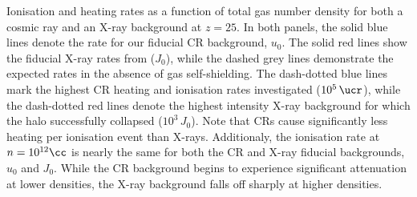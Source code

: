 Ionisation and heating rates as a function of total gas number density for both a cosmic ray and an X-ray background at $z=25$. In both panels, the solid blue lines denote the rate for our fiducial CR background, $u_0$. The solid red lines show the fiducial X-ray rates from \citet{Hummeletal2015} ($J_0$), while the dashed grey lines demonstrate the expected rates in the absence of gas self-shielding.  The dash-dotted blue lines mark the highest CR heating and ionisation rates investigated ($10^5\,\ucr$), while the dash-dotted red lines denote the highest intensity X-ray background for which the halo successfully collapsed ($10^3\,J_0$). Note that CRs cause significantly less heating per ionisation event than X-rays. Additionaly, the ionisation rate at $n=10^{12}\cc$ is nearly the same for both the CR and X-ray fiducial backgrounds, $u_0$ and $J_0$. While the CR background begins to experience significant attenuation at lower densities, the X-ray background falls off sharply at higher densities. 